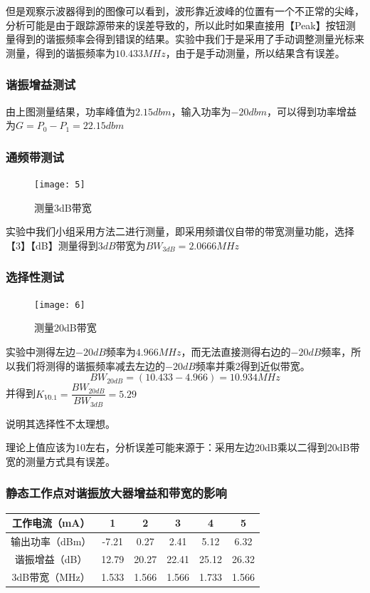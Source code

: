 \documentclass{../source/Experiment}
\begin{document}
但是观察示波器得到的图像可以看到，波形靠近波峰的位置有一个不正常的尖峰，分析可能是由于跟踪源带来的误差导致的，所以此时如果直接用【Peak】按钮测量得到的谐振频率会得到错误的结果。实验中我们于是采用了手动调整测量光标来测量，得到的谐振频率为$10.433MHz$，由于是手动测量，所以结果含有误差。

\subsubsection{谐振增益测试}

由上图测量结果，功率峰值为$2.15dbm$，输入功率为$-20dbm$，可以得到功率增益为$G = P_0 - P_1 = 22.15dbm$

\subsubsection{通频带测试}

\begin{figure}[H]
    \centering
    \texttt{[image: 5]}
    \caption{测量3dB带宽}
\end{figure}

实验中我们小组采用方法二进行测量，即采用频谱仪自带的带宽测量功能，选择【3】【dB】测量得到$3dB$带宽为$BW_{3dB} = 2.0666MHz$

\subsubsection{选择性测试}

\begin{figure}[H]
    \centering
    \texttt{[image: 6]}
    \caption{测量20dB带宽}
\end{figure}

实验中测得左边$-20dB$频率为$4.966MHz$，而无法直接测得右边的$-20dB$频率，所以我们将测得的谐振频率减去左边的$-20dB$频率并乘2得到近似带宽。
$$BW_{20dB} = (10.433 - 4.966) = 10.934MHz$$
并得到$K_{V0.1} = \dfrac{BW_{20dB}}{BW_{3dB}} = 5.29$

说明其选择性不太理想。

理论上值应该为10左右，分析误差可能来源于：采用左边20dB乘以二得到20dB带宽的测量方式具有误差。

\subsubsection{静态工作点对谐振放大器增益和带宽的影响}

\begin{table}[H]
    \centering
    \begin{tabular}{|c|c|c|c|c|c|}
        \hline
        工作电流（mA）  & 1     & 2     & 3     & 4     & 5     \\ \hline
        输出功率（dBm） & -7.21 & 0.27  & 2.41  & 5.12  & 6.32  \\ \hline
        谐振增益（dB）  & 12.79 & 20.27 & 22.41 & 25.12 & 26.32 \\ \hline
        3dB带宽（MHz）  & 1.533 & 1.566 & 1.566 & 1.733 & 1.566 \\ \hline
    \end{tabular}
\end{table}
\end{document}
